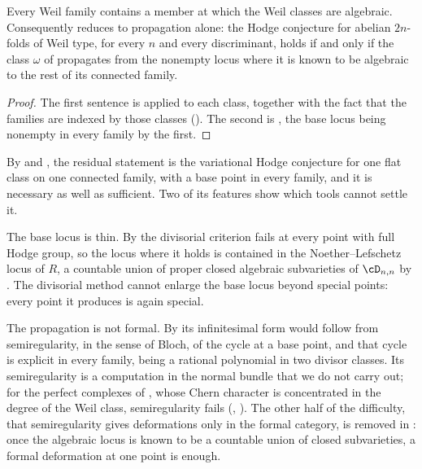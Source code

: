 \begin{corollary}\label{cor:R2}
Every Weil family contains a member at which the Weil classes are algebraic.
Consequently  reduces to propagation alone: the Hodge
conjecture for abelian $2n$-folds of Weil type, for every $n$ and every
discriminant, holds if and only if the class $\omega$ of
 propagates from the nonempty locus where it is known to be
algebraic to the rest of its connected family.
\end{corollary}

\begin{proof}
The first sentence is  applied to each class, together
with the fact that the families are indexed by those classes
(). The second is , the base locus being
nonempty in every family by the first.
\end{proof}

\begin{remark}\label{rem:whatsleftnow}
By  and , the residual statement is the
variational Hodge conjecture for one flat class on one connected family, with
a base point in every family, and it is necessary as well as sufficient. Two
of its features show which tools cannot settle it.

The base locus is thin. By  the divisorial criterion fails
at every point with full Hodge group, so the locus where it holds is contained
in the Noether--Lefschetz locus of $R$, a countable union of proper closed
algebraic subvarieties of $\cD_{n,n}$ by . The divisorial
method cannot enlarge the base locus beyond special points: every point it
produces is again special.

The propagation is not formal. By  its infinitesimal
form would follow from semiregularity, in the sense of Bloch, of the cycle at
a base point, and that cycle is explicit in every family, being a rational
polynomial in two divisor classes. Its semiregularity is a computation in the
normal bundle that we do not carry out; for the perfect complexes of
\cite[Proposition~2.1]{paperII}, whose Chern character is concentrated in the degree of
the Weil class, semiregularity fails (,
\cite[Theorem~3.5]{paperII}). The other half of the difficulty, that semiregularity
gives deformations only in the formal category, is removed in
: once the algebraic locus is known to be a countable
union of closed subvarieties, a formal deformation at one point is enough.
\end{remark}


